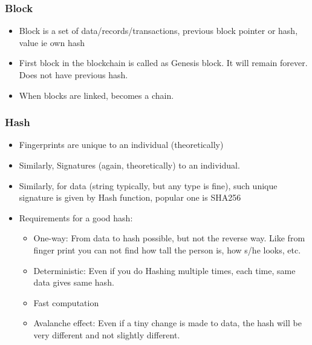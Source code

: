 \begin{frame}[fragile]\frametitle{Block}
\begin{itemize}
\item Block is a set of data/records/transactions, previous block pointer or hash, value ie own hash
\item First block in the blockchain is called as Genesis block. It will remain forever. Does not have previous hash.
\item When blocks are linked, becomes a chain.
\end{itemize}

\end{frame}

\begin{frame}[fragile]\frametitle{Hash}
\begin{itemize}
\item Fingerprints are unique to an individual (theoretically)
\item Similarly, Signatures (again, theoretically) to an individual.
\item Similarly, for data (string typically, but any type is fine), such unique signature is given by Hash function, popular one is SHA256
\item Requirements for a good hash:
	\begin{itemize}
	\item One-way: From data to hash possible, but not the reverse way. Like from finger print you can not find how tall the person is, how s/he looks, etc.
	\item Deterministic: Even if you do Hashing multiple times, each time, same data gives same hash.
	\item Fast computation
	\item Avalanche effect: Even if a tiny change is made to data, the hash will be very different and not slightly different.
	\end{itemize}
\end{itemize}

\end{frame}



